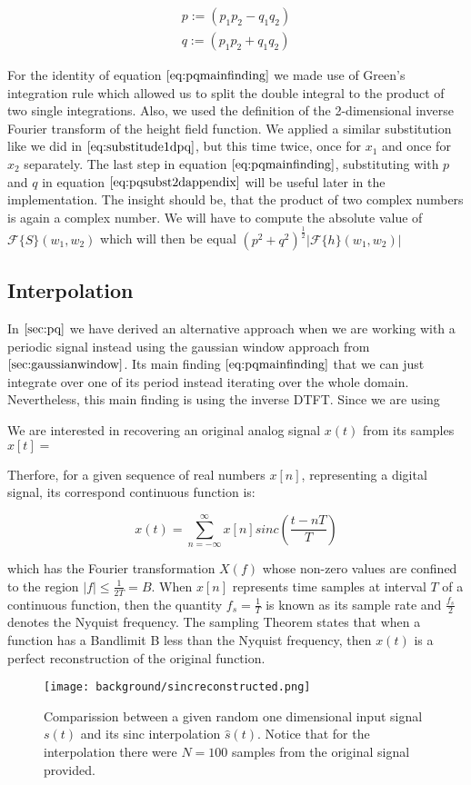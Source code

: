 \begin{align}
p := (p_1 p_2 - q_1 q_2) \nonumber \\ 
q := (p_1 p_2 + q_1 q_2)
\label{eq:pqsubst2}
\end{align}

For the identity of equation $\ref{eq:pqmainfinding}$ we made use of Green's integration rule which allowed us to split the double integral to the product of two single integrations. Also, we used the definition of the 2-dimensional inverse Fourier transform of the height field function. We applied a similar substitution like we did in $\ref{eq:substitude1dpq}$, but this time twice, once for $x_1$ and once for $x_2$ separately. The last step in equation $\ref{eq:pqmainfinding}$, substituting with $p$ and $q$ in equation $\ref{eq:pqsubst2dappendix}$ will be useful later in the implementation. The insight should be, that the product of two complex numbers is again a complex number. We will have to compute the absolute value of $\mathcal{F}\{S\}(w_1,w_2)$ which will then be equal $(p^2 + q^2)^{\frac{1}{2}}\left|\mathcal{F}\{h\}(w_1,w_2)\right|$


\subsection{Interpolation}
\label{sec:sincinterpolation}

In $\ref{sec:pq}$ we have derived an alternative approach when we are working with a periodic signal instead using the gaussian window approach from $\ref{sec:gaussianwindow}$. Its main finding $\ref{eq:pqmainfinding}$ that we can just integrate over one of its period instead iterating over the whole domain. Nevertheless, this main finding is using the inverse DTFT. Since we are using 

We are interested in recovering an original analog signal $x(t)$ from its samples $x[t] = $ 

Therfore, for a given sequence of real numbers $x[n]$, representing a digital signal, its correspond continuous function is: 

\begin{equation}
  x(t) = \sum_{n=-\infty}^{\infty} x[n] sinc\left(\frac{t-nT}{T}\right)
\end{equation}

which has the Fourier transformation $X(f)$ whose non-zero values are confined to the region $|f| \leq \frac{1}{2T} = B$.
When $x[n]$ represents time samples at interval $T$ of a continuous function, then the quantity $f_s = \frac{1}{T}$ is known as its sample rate and $\frac{f_s}{2}$ denotes the Nyquist frequency. The sampling Theorem states that when a function has a Bandlimit B less than the Nyquist frequency, then $x(t)$ is a perfect reconstruction of the original function. 

\begin{figure}[ht]
  \centering
  \texttt{[image: background/sincreconstructed.png]}
  \caption{Comparission between a given random one dimensional input signal $s(t)$ and its sinc interpolation $\hat{s}(t)$. Notice that for the interpolation there were $N=100$ samples from the original signal provided.}
  \label{fig:plotsincinterpolation}  
\end{figure}
